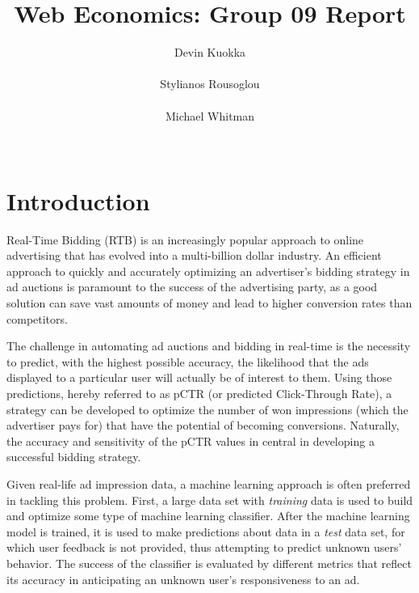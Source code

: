\documentclass{sig-alternate-05-2015}
\begin{document}

\title{Web Economics: Group 09 Report}

\author{
\alignauthor
Devin Kuokka\\
       \\
\alignauthor
Stylianos Rousoglou\\
       \\
\alignauthor
Michael Whitman\\
       \\
}
\maketitle

\section{Introduction}
Real-Time Bidding (RTB) is an increasingly popular approach to online advertising that has evolved into a multi-billion dollar industry. An efficient approach to quickly and accurately optimizing an advertiser's bidding strategy in ad auctions is paramount to the success of the advertising party, as a good solution can save vast amounts of money and lead to higher conversion rates than competitors.

The challenge in automating ad auctions and bidding in real-time is the necessity to predict, with the highest possible accuracy, the likelihood that the ads displayed to a particular user will actually be of interest to them. Using those predictions, hereby referred to as pCTR (or predicted Click-Through Rate), a strategy can be developed to optimize the number of won impressions (which the advertiser pays for) that have the potential of becoming conversions. Naturally, the accuracy and sensitivity of the pCTR values in central in developing a successful bidding strategy.

Given real-life ad impression data, a machine learning approach is often preferred in tackling this problem. First, a large data set with \textit{training} data is used to build and optimize some type of machine learning classifier. After the machine learning model is trained, it is used to make predictions about data in a \textit{test} data set, for which user feedback is not provided, thus attempting to predict unknown users' behavior. The success of the classifier is evaluated by different metrics that reflect its accuracy in anticipating an unknown user's responsiveness to an ad. 
\end{document}
